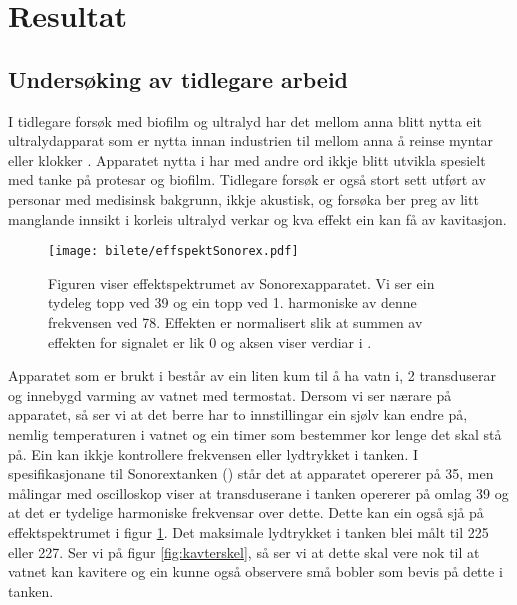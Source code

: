 \section{Resultat}
\subsection{Undersøking av tidlegare arbeid}
I tidlegare forsøk med biofilm og ultralyd har det mellom anna blitt nytta eit ultralydapparat som er nytta innan industrien til mellom anna å reinse myntar eller klokker \cite{sonorex}. Apparatet nytta i \cite{ultraprotese} har med andre ord ikkje blitt utvikla spesielt med tanke på protesar og biofilm. Tidlegare forsøk er også stort sett utført av personar med medisinsk bakgrunn, ikkje akustisk, og forsøka ber preg av litt manglande innsikt i korleis ultralyd verkar og kva effekt ein kan få av kavitasjon.

\begin{figure}[htbp]
	\centering
	\texttt{[image: bilete/effspektSonorex.pdf]}
	\caption[Effektspektrum av Sonorexapparat]{Figuren viser effektspektrumet av Sonorexapparatet. Vi ser ein tydeleg topp ved \unit{39}{\kilo\hertz} og ein topp ved 1. harmoniske av denne frekvensen ved \unit{78}{\kilo\hertz}. Effekten er normalisert slik at summen av effekten for signalet er lik \unit{0}{\deci\bel} og aksen viser verdiar i \deci\bel.}
	\label{fig:effektsonorex}
\end{figure}

Apparatet som er brukt i \cite{ultraprotese} består av ein liten kum til å ha vatn i, 2 transduserar og innebygd varming av vatnet med termostat. Dersom vi ser nærare på apparatet, så ser vi at det berre har to innstillingar ein sjølv kan endre på, nemlig temperaturen i vatnet og ein timer som bestemmer kor lenge det skal stå på. Ein kan ikkje kontrollere frekvensen eller lydtrykket i tanken. I spesifikasjonane til Sonorextanken (\cite{sonorex}) står det at apparatet opererer på \unit{35}{\kilo\hertz}, men målingar med oscilloskop viser at transduserane i tanken opererer på omlag \unit{39}{\kilo\hertz} og at det er tydelige harmoniske frekvensar over dette. Dette kan ein også sjå på effektspektrumet i figur \ref{fig:effektsonorex}. Det maksimale lydtrykket i tanken blei målt til \unit{225}{\kilo\pascal} eller \unit{227}{\deci\bel}. Ser vi på figur \ref{fig:kavterskel}, så ser vi at dette skal vere nok til at vatnet kan kavitere og ein kunne også observere små bobler som bevis på dette i tanken.

